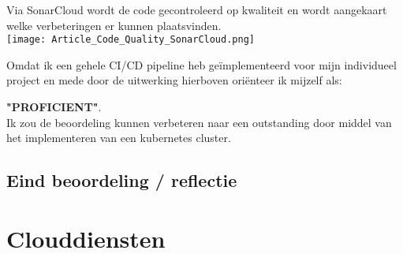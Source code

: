 Via SonarCloud wordt de code gecontroleerd op kwaliteit en wordt aangekaart welke verbeteringen er kunnen plaatsvinden.\\

\texttt{[image: Article\_Code\_Quality\_SonarCloud.png]}\label{fig:figure2}


Omdat ik een gehele CI/CD pipeline heb geïmplementeerd voor mijn individueel project en mede door de uitwerking hierboven oriënteer ik mijzelf als:
\par\vspace{10pt}\textbf{\uppercase{"Proficient"}}.\\

Ik zou de beoordeling kunnen verbeteren naar een outstanding door middel van het implementeren van een kubernetes cluster.

\subsection{Eind beoordeling / reflectie}










\newpage
\section{Clouddiensten}\label{sec:clouddiensten}

